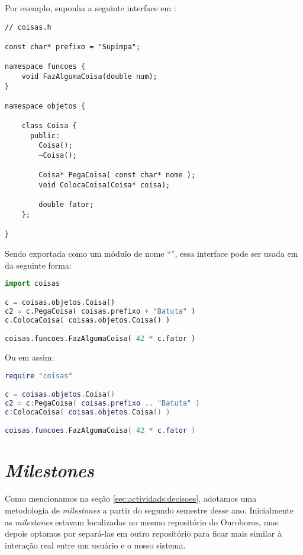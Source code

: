 Por exemplo, suponha a seguinte interface em \CXX{}:

\vspace{1em}
\begin{lstlisting}
// coisas.h

const char* prefixo = "Supimpa";

namespace funcoes {
    void FazAlgumaCoisa(double num);
}

namespace objetos {

    class Coisa {
      public:
        Coisa();
        ~Coisa();
        
        Coisa* PegaCoisa( const char* nome );
        void ColocaCoisa(Coisa* coisa);
        
        double fator;
    };

}
\end{lstlisting}
\vspace{1em}

Sendo exportada como um módulo de nome ``'', essa interface pode
ser usada em  da seguinte forma:

\vspace{1em}
\begin{lstlisting}[language=python]
import coisas

c = coisas.objetos.Coisa()
c2 = c.PegaCoisa( coisas.prefixo + "Batuta" )
c.ColocaCoisa( coisas.objetos.Coisa() )

coisas.funcoes.FazAlgumaCoisa( 42 * c.fator )
\end{lstlisting}
\vspace{1em}

Ou em  assim:

\vspace{1em}
\begin{lstlisting}[language=lua]
require "coisas"

c = coisas.objetos.Coisa()
c2 = c:PegaCoisa( coisas.prefixo .. "Batuta" )
c:ColocaCoisa( coisas.objetos.Coisa() )

coisas.funcoes.FazAlgumaCoisa( 42 * c.fator )
\end{lstlisting}
\vspace{1em}


\section{\textit{Milestones}}
\label{cap:resultados:milestones}

Como mencionamos na seção \ref{sec:actividads:decisoes}, adotamos uma metodologia de
\textit{milestones} a partir do segundo semestre desse ano.
Inicialmente as \textit{milestones} estavam localizadas no mesmo repositório do 
Ouroboros, mas depois optamos por separá-las em outro repositório para ficar mais
similar à interação real entre um usuário e o nosso sistema. 

